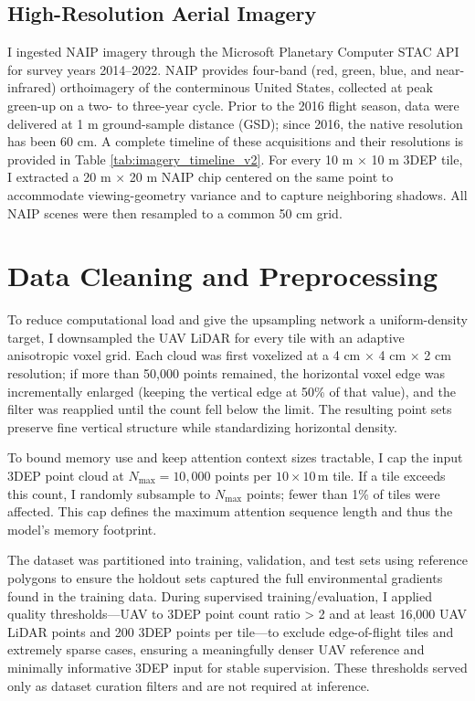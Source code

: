 \documentclass[12pt]{report}
\begin{document}
\subsection{High-Resolution Aerial Imagery}
I ingested NAIP imagery through the Microsoft Planetary Computer STAC API \citep{planetary_computer} for survey years 2014–2022. NAIP provides four-band (red, green, blue, and near-infrared) orthoimagery of the conterminous United States, collected at peak green-up on a two- to three-year cycle. Prior to the 2016 flight season, data were delivered at 1 m ground-sample distance (GSD); since 2016, the native resolution has been 60 cm. A complete timeline of these acquisitions and their resolutions is provided in Table \ref{tab:imagery_timeline_v2}. For every 10 m × 10 m 3DEP tile, I extracted a 20 m × 20 m NAIP chip centered on the same point to accommodate viewing-geometry variance and to capture neighboring shadows. All NAIP scenes were then resampled to a common 50 cm grid.



\section{Data Cleaning and Preprocessing}
To reduce computational load and give the upsampling network a uniform-density target, I downsampled the UAV LiDAR for every tile with an adaptive anisotropic voxel grid. Each cloud was first voxelized at a 4 cm × 4 cm × 2 cm resolution; if more than 50,000 points remained, the horizontal voxel edge was incrementally enlarged (keeping the vertical edge at 50\% of that value), and the filter was reapplied until the count fell below the limit. The resulting point sets preserve fine vertical structure while standardizing horizontal density.

To bound memory use and keep attention context sizes tractable, I cap the input 3DEP point cloud at $N_{\max}=10{,}000$ points per $10\times10$\,m tile. If a tile exceeds this count, I randomly subsample to $N_{\max}$ points; fewer than 1\% of tiles were affected. This cap defines the maximum attention sequence length and thus the model's memory footprint.

The dataset was partitioned into training, validation, and test sets using reference polygons to ensure the holdout sets captured the full environmental gradients found in the training data. During supervised training/evaluation, I applied quality thresholds—UAV to 3DEP point count ratio > 2 and at least 16,000 UAV LiDAR points and 200 3DEP points per tile—to exclude edge-of-flight tiles and extremely sparse cases, ensuring a meaningfully denser UAV reference and minimally informative 3DEP input for stable supervision. These thresholds served only as dataset curation filters and are not required at inference.
\end{document}
